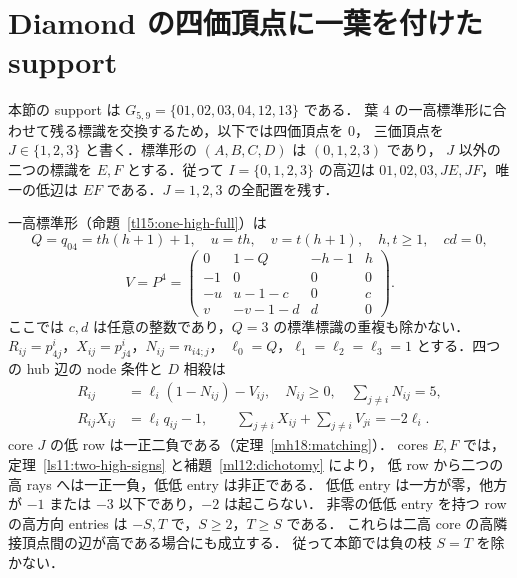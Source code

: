 \section{Diamond の四価頂点に一葉を付けた support}
\label{dl19:section}
本節の support は $G_{5,9}=\{01,02,03,04,12,13\}$ である．
葉 $4$ の一高標準形に合わせて残る標識を交換するため，以下では四価頂点を $0$，
三価頂点を $J\in\{1,2,3\}$ と書く．標準形の $(A,B,C,D)$ は $(0,1,2,3)$ であり，
$J$ 以外の二つの標識を $E,F$ とする．従って $I=\{0,1,2,3\}$ の高辺は
$01,02,03,JE,JF$，唯一の低辺は $EF$ である．$J=1,2,3$ の全配置を残す．

一高標準形（命題~\ref{tl15:one-high-full}）は
\[
 Q=q_{04}=th(h+1)+1,\quad u=th,\quad v=t(h+1),\quad h,t\ge1,\quad cd=0,
\]
\[
 V=P^4=\begin{pmatrix}
0&1-Q&-h-1&h\\-1&0&0&0\\-u&u-1-c&0&c\\v&-v-1-d&d&0
\end{pmatrix}.
\]
ここでは $c,d$ は任意の整数であり，$Q=3$ の標準標識の重複も除かない．
$R_{ij}=p^i_{4j}$，$X_{ij}=p^i_{j4}$，$N_{ij}=n_{i4;j}$，
$\ell_0=Q$，$\ell_1=\ell_2=\ell_3=1$ とする．四つの hub 辺の node 条件と $D$ 相殺は
\begin{align}
 R_{ij}&=\ell_i(1-N_{ij})-V_{ij},\quad N_{ij}\ge0,\quad\sum_{j\ne i}N_{ij}=5,
 \label{dl19:reconstruct}\\
 R_{ij}X_{ij}&=\ell_iq_{ij}-1,\qquad
 \sum_{j\ne i}X_{ij}+\sum_{j\ne i}V_{ji}=-2\ell_i.
 \label{dl19:pairD}
\end{align}
core $J$ の低 row は一正二負である（定理~\ref{mh18:matching}）．
cores $E,F$ では，定理~\ref{ls11:two-high-signs} と補題~\ref{ml12:dichotomy} により，
低 row から二つの高 rays へは一正一負，低低 entry は非正である．
低低 entry は一方が零，他方が $-1$ または $-3$ 以下であり，$-2$ は起こらない．
非零の低低 entry を持つ row の高方向 entries は $-S,T$ で，$S\ge2$，$T\ge S$ である．
これらは二高 core の高隣接頂点間の辺が高である場合にも成立する．
従って本節では負の枝 $S=T$ を除かない．


